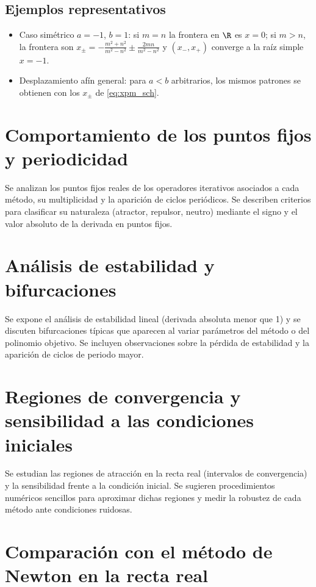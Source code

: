 \subsection{Ejemplos representativos}

\begin{itemize}
\item Caso simétrico $a=-1$, $b=1$: si $m=n$ la frontera en $\R$ es $x=0$; si $m>n$, la frontera son $x_{\pm}= -\tfrac{m^2+n^2}{m^2-n^2} \pm \tfrac{2mn}{m^2-n^2}$ y $(x_{-},x_{+})$ converge a la raíz simple $x=-1$.
\item Desplazamiento afín general: para $a<b$ arbitrarios, los mismos patrones se obtienen con los $x_{\pm}$ de \eqref{eq:xpm_sch}.
\end{itemize}

\section{Comportamiento de los puntos fijos y periodicidad}

Se analizan los puntos fijos reales de los operadores iterativos asociados a cada método, su multiplicidad y la aparición de ciclos periódicos. Se describen criterios para clasificar su naturaleza (atractor, repulsor, neutro) mediante el signo y el valor absoluto de la derivada en puntos fijos.

\section{Análisis de estabilidad y bifurcaciones}

Se expone el análisis de estabilidad lineal (derivada absoluta menor que 1) y se discuten bifurcaciones típicas que aparecen al variar parámetros del método o del polinomio objetivo. Se incluyen observaciones sobre la pérdida de estabilidad y la aparición de ciclos de periodo mayor.

\section{Regiones de convergencia y sensibilidad a las condiciones iniciales}

Se estudian las regiones de atracción en la recta real (intervalos de convergencia) y la sensibilidad frente a la condición inicial. Se sugieren procedimientos numéricos sencillos para aproximar dichas regiones y medir la robustez de cada método ante condiciones ruidosas.

\section{Comparación con el método de Newton en la recta real}

